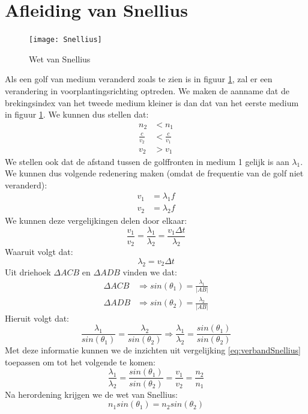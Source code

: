 \documentclass[a4paper,kul]{kulakarticle} %
\begin{document}
\section{Afleiding van Snellius}
\begin{figure}[!h]
	\centering
	\texttt{[image: Snellius]}
	\caption[Snellius]{Wet van Snellius}
	\label{fig:snellius}
\end{figure}
Als een golf van medium veranderd zoals te zien is in figuur \ref{fig:snellius}, zal er een verandering in voorplantingsrichting optreden. We maken de aanname dat de brekingsindex van het tweede medium kleiner is dan dat van het eerste medium in figuur \ref{fig:snellius}. We kunnen dus stellen dat:
\begin{align*}
	n_2&<n_1\\
	\frac{c}{v_2}&<\frac{c}{v_1}\\
	v_2&>v_1
\end{align*}
We stellen ook dat de afstand tussen de golffronten in medium 1 gelijk is aan $\lambda_1$. We kunnen dus volgende redenering maken (omdat de frequentie van de golf niet veranderd):
\begin{align*}
	v_1&=\lambda_1f\\
	v_2&=\lambda_2f
\end{align*}
We kunnen deze vergelijkingen delen door elkaar:
\begin{equation}
	\label{eq:verbandSnellius}
	\frac{v_1}{v_2}=\frac{\lambda_1}{\lambda_2}=\frac{v_1\Delta t}{\lambda_2}
\end{equation}
Waaruit volgt dat:
\begin{equation*}
	\lambda_2=v_2\Delta t
\end{equation*}
Uit driehoek $\Delta ACB$ en $\Delta ADB$ vinden we dat:
\begin{align*}
	\Delta ACB&\Rightarrow sin(\theta_1) = \frac{\lambda_1}{|AB|}\\
	\Delta ADB&\Rightarrow sin(\theta_2) = \frac{\lambda_2}{|AB|}
\end{align*}
Hieruit volgt dat:
\begin{equation*}
	\frac{\lambda_1}{sin(\theta_1)}= \frac{\lambda_2}{sin(\theta_2)} \Rightarrow \frac{\lambda_1}{\lambda_2}=\frac{sin(\theta_1)}{sin(\theta_2)}
\end{equation*}
Met deze informatie kunnen we de inzichten uit vergelijking \ref{eq:verbandSnellius} toepassen om tot het volgende te komen:
\begin{equation*}
	\frac{\lambda_1}{\lambda_2}=\frac{sin(\theta_1)}{sin(\theta_2)}=\frac{v_1}{v_2}= \frac{n_2}{n_1}
\end{equation*}
Na herordening krijgen we de wet van Snellius:
\begin{equation}
	n_1sin(\theta_1)=n_2sin(\theta_2)
\end{equation}
\newpage
\end{document}
